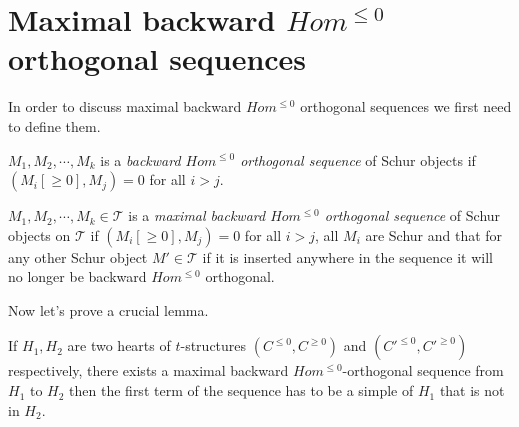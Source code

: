\section{Maximal backward $Hom^{\leq 0}$ orthogonal sequences}
\indent In order to discuss maximal backward $Hom^{\leq 0}$ orthogonal sequences we first need to define them.\\
\begin{definition}
$M_1,M_2,\cdots, M_k$ is a \textit{backward $Hom^{\leq 0}$ orthogonal sequence} of Schur objects if $(M_i[\geq 0], M_j) = 0$ for all $i>j$.
\end{definition}
\begin{definition}
$M_1,M_2,\cdots, M_k\in \mathcal{T}$ is a \textit{maximal backward $Hom^{\leq 0}$ orthogonal sequence} of Schur objects on $\mathcal{T}$ if $(M_i[\geq 0], M_j) = 0$ for all $i>j$, all $M_i$ are Schur and that for any other Schur object $M'\in \mathcal{T}$ if it is inserted anywhere in the sequence it will no longer be backward $Hom^{\leq 0}$ orthogonal.
\end{definition}
\indent Now let's prove a crucial lemma.\\
\begin{lemma}\label{lem:C3L1}
If $H_1, H_2$ are two hearts of $t$-structures $(C^{\leq 0}, C^{\geq 0})$ and $(C'^{\leq 0}, C'^{\geq 0})$ respectively, there exists a maximal backward $Hom^{\leq 0}$-orthogonal sequence from $H_1$ to $H_2$ then the first term of the sequence has to be a simple of $H_1$ that is not in $H_2$.
\end{lemma}
